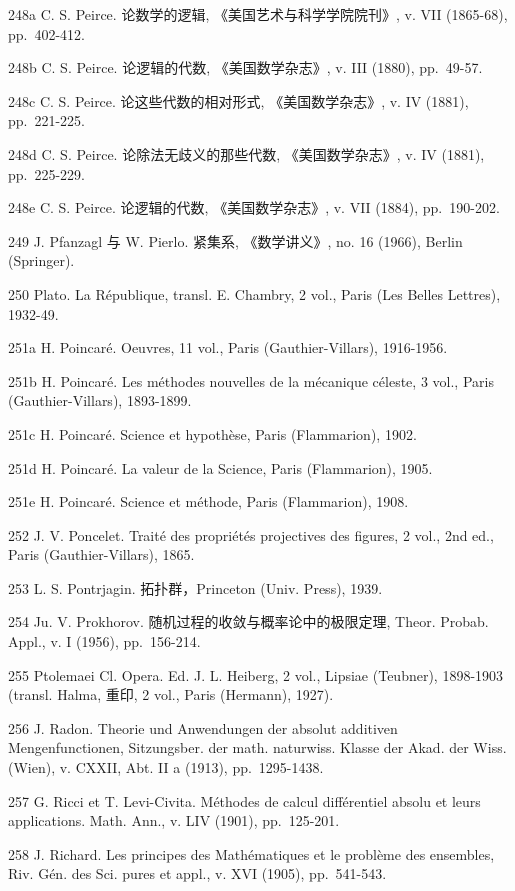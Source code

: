 248a C. S. Peirce. 论数学的逻辑, 《美国艺术与科学学院院刊》, v. VII (1865-68), pp.~402-412.

248b C. S. Peirce. 论逻辑的代数, 《美国数学杂志》, v. III (1880), pp.~49-57.

248c C. S. Peirce. 论这些代数的相对形式, 《美国数学杂志》, v. IV (1881), pp.~221-225.

248d C. S. Peirce. 论除法无歧义的那些代数, 《美国数学杂志》, v. IV (1881), pp.~225-229.

248e C. S. Peirce. 论逻辑的代数, 《美国数学杂志》, v. VII (1884), pp.~190-202.

249 J. Pfanzagl 与 W. Pierlo. 紧集系, 《数学讲义》, no. 16 (1966), Berlin (Springer).

250 Plato. La République, transl. E. Chambry, 2 vol., Paris (Les Belles Lettres), 1932-49.

251a H. Poincaré. Oeuvres, 11 vol., Paris (Gauthier-Villars), 1916-1956.

251b H. Poincaré. Les méthodes nouvelles de la mécanique céleste, 3 vol., Paris (Gauthier-Villars), 1893-1899.

251c H. Poincaré. Science et hypothèse, Paris (Flammarion), 1902.

251d H. Poincaré. La valeur de la Science, Paris (Flammarion), 1905.

251e H. Poincaré. Science et méthode, Paris (Flammarion), 1908.

252 J. V. Poncelet. Traité des propriétés projectives des figures, 2 vol., 2nd ed., Paris (Gauthier-Villars), 1865.

253 L. S. Pontrjagin. 拓扑群，Princeton (Univ. Press), 1939.

254 Ju. V. Prokhorov. 随机过程的收敛与概率论中的极限定理, Theor. Probab. Appl., v. I (1956), pp.~156-214.

255 Ptolemaei Cl. Opera. Ed. J. L. Heiberg, 2 vol., Lipsiae (Teubner), 1898-1903 (transl. Halma, 重印, 2 vol., Paris (Hermann), 1927).

256 J. Radon. Theorie und Anwendungen der absolut additiven Mengenfunctionen, Sitzungsber. der math. naturwiss. Klasse der Akad. der Wiss. (Wien), v. CXXII, Abt. II a (1913), pp.~1295-1438.

257 G. Ricci et T. Levi-Civita. Méthodes de calcul différentiel absolu et leurs applications. Math. Ann., v. LIV (1901), pp.~125-201.

258 J. Richard. Les principes des Mathématiques et le problème des ensembles, Riv. Gén. des Sci. pures et appl., v. XVI (1905), pp.~541-543.

